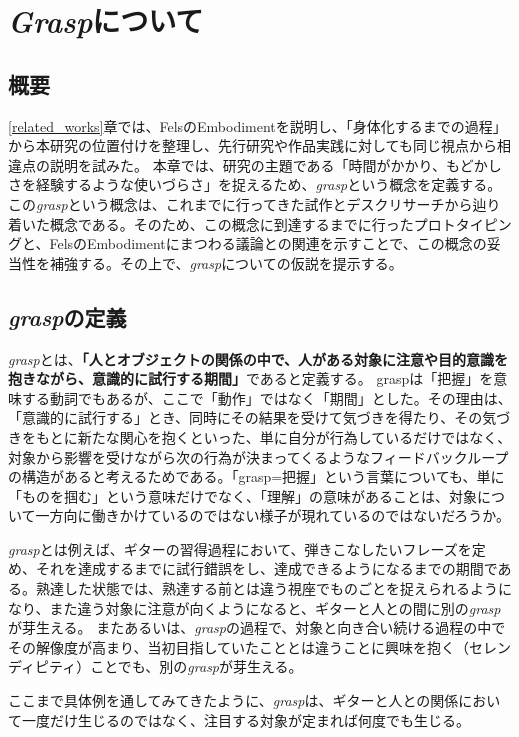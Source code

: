 \chapter{\textit{Grasp}について}
\label{graspについて}

\section{概要}
\ref{related_works}章では、FelsのEmbodimentを説明し、「身体化するまでの過程」から本研究の位置付けを整理し、先行研究や作品実践に対しても同じ視点から相違点の説明を試みた。
本章では、研究の主題である「時間がかかり、もどかしさを経験するような使いづらさ」を捉えるため、\textit{grasp}という概念を定義する。この\textit{grasp}という概念は、これまでに行ってきた試作とデスクリサーチから辿り着いた概念である。そのため、この概念に到達するまでに行ったプロトタイピングと、FelsのEmbodimentにまつわる議論との関連を示すことで、この概念の妥当性を補強する。その上で、\textit{grasp}についての仮説を提示する。\\

\section{\textit{grasp}の定義}
\label{grasp_difinition}
\textit{grasp}とは、\textbf{「人とオブジェクトの関係の中で、人がある対象に注意や目的意識を抱きながら、意識的に試行する期間」}であると定義する。
graspは「把握」を意味する動詞でもあるが、ここで「動作」ではなく「期間」とした。その理由は、「意識的に試行する」とき、同時にその結果を受けて気づきを得たり、その気づきをもとに新たな関心を抱くといった、単に自分が行為しているだけではなく、対象から影響を受けながら次の行為が決まってくるようなフィードバックループの構造があると考えるためである。「grasp=把握」という言葉についても、単に「ものを掴む」という意味だけでなく、「理解」の意味があることは、対象について一方向に働きかけているのではない様子が現れているのではないだろうか。

\textit{grasp}とは例えば、ギターの習得過程において、弾きこなしたいフレーズを定め、それを達成するまでに試行錯誤をし、達成できるようになるまでの期間である。熟達した状態では、熟達する前とは違う視座でものごとを捉えられるようになり、また違う対象に注意が向くようになると、ギターと人との間に別の\textit{grasp}が芽生える。
またあるいは、\textit{grasp}の過程で、対象と向き合い続ける過程の中でその解像度が高まり、当初目指していたこととは違うことに興味を抱く（セレンディピティ）ことでも、別の\textit{grasp}が芽生える。

ここまで具体例を通してみてきたように、\textit{grasp}は、ギターと人との関係において一度だけ生じるのではなく、注目する対象が定まれば何度でも生じる。

